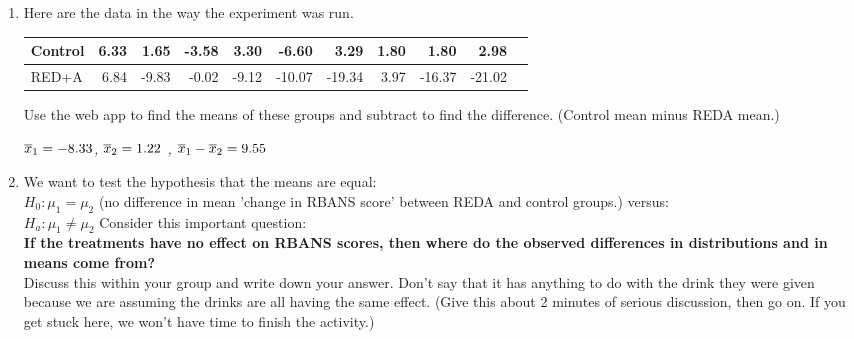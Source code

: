 \begin{enumerate}
\begin{key}
  {\it            RED+A seems most symmetric (boxplot), Cotrol
         has some outliers.
}
\end{key}


The researchers used a computer randomization to assign the 
subjects into the groups. We'll shuffle cards instead. 

\item Here are the data in the way the experiment was run.

  \begin{tabular}{l|rrrrrrrrrr} \hline
Control&6.33&1.65&-3.58&3.30&-6.60&3.29&1.80&1.80&2.98&\\ \hline
RED+A & 6.84&-9.83&-0.02&-9.12&-10.07&-19.34&3.97&-16.37&-21.02&\\ \hline
\end{tabular}

Use the web app to find the means of these groups and subtract to find
the difference.  (Control mean minus REDA mean.) 
\begin{students}
    \vspace{1cm}    
\end{students}

\begin{key}
  {\it   $\overline{x}_1 = -8.33$, $\overline{x}_2 = 1.22$ ,  $\overline{x}_1 -\overline{x}_2 = 9.55$ }
\end{key}


\item  
We want to test the hypothesis that the means are equal:\\
  $H_0: \mu_1 = \mu_2$  (no difference in mean 'change in RBANS score'
  between REDA and control groups.)  versus:\\
  $H_a:  \mu_1 \neq \mu_2$ \hfill Consider this important question:
  \\
{\bf \sf
If the treatments have no effect on RBANS scores, then where do the
observed differences in distributions and in means come from?
}\vspace*{.2cm} \\
   Discuss this within your group and write down your answer.
  Don't say that it has anything to do with the drink they were given
  because we are assuming the drinks are all having the same effect. 
  (Give this about 2 minutes of serious discussion, then go on.
   If you get stuck here, we  won't have time to finish the activity.)
\begin{students}
    \vspace{2cm}    
\end{students}


\end{enumerate}
